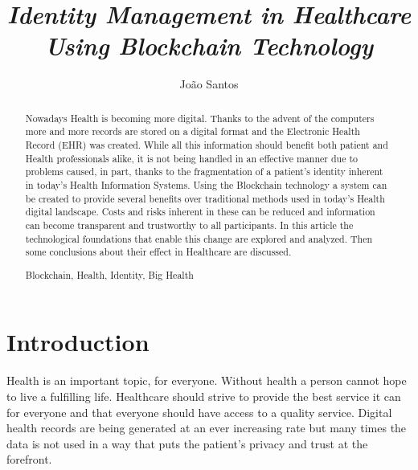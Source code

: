 \documentclass[notitlepage]{llncs}
\newcommand{\keywords}[1]{\par\addvspace\baselineskip
\noindent\keywordname\enspace\ignorespaces#1}
\begin{document}
\title{%
\textit{Identity Management in Healthcare Using Blockchain Technology}}

\author{%
João Santos}


{\def\addcontentsline#1#2#3{}\maketitle}



\begin{abstract}
Nowadays Health is becoming more digital. Thanks to the advent of the computers more and more records are stored on a digital format and the Electronic Health Record (EHR) was created. While all this information should benefit both patient and Health professionals alike, it is not being handled in an effective manner due to problems caused, in part, thanks to the fragmentation of a patient's identity inherent in today's Health Information Systems. Using the Blockchain technology a system can be created to provide several benefits over traditional methods used in today's Health digital landscape. Costs and risks inherent in these can be reduced and information can become transparent and trustworthy to all participants. In this article the technological foundations that enable this change are explored and analyzed. Then some conclusions about their effect in Healthcare are discussed.
\keywords{Blockchain, Health, Identity, Big Health}
\end{abstract}


\section{Introduction}

Health is an important topic, for everyone. Without health a person cannot hope to live a fulfilling life. Healthcare should strive to provide the best service it can for everyone and that everyone should have access to a quality service. Digital health records are being generated at an ever increasing rate but many times the data is not used in a way that puts the patient's privacy and trust at the forefront.
\end{document}
